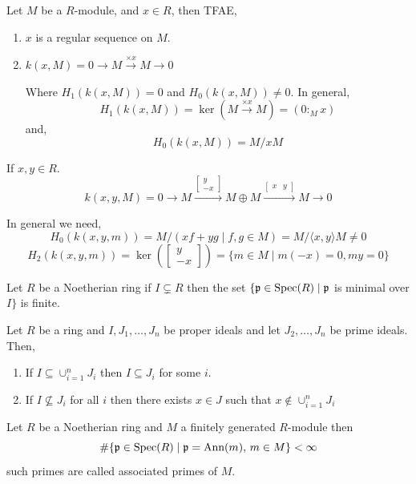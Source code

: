\documentclass[12pt]{amsart}
\begin{document}
\begin{proposition}
    Let $M$ be a $R$-module, and $x \in R$, then TFAE, 
    \begin{enumerate}
        \item $x$ is a regular sequence on $M$. 
        \item $k(x, M) = 0 \to M \xrightarrow{\times x} M \to 0$ 
        
        Where $H_1(k(x,M)) = 0$ and $H_0(k(x,M)) \neq 0$. In general, 
        \[H_1(k(x,M)) = \ker(M \xrightarrow{\times x} M) = (0:_Mx) \]
        and, 
        \[H_0(k(x,M)) = M/xM \]
    \end{enumerate}

    If $x, y \in R$. 
    \[k(x, y, M) = 0 \to M \xrightarrow{ \begin{bmatrix}
        y \\ -x
    \end{bmatrix}} M \oplus M \xrightarrow{\begin{bmatrix}
        x & y
    \end{bmatrix}} M \to 0\]

    In general we need, 
    \[H_0(k(x,y,m)) = M/(xf + yg \mid f, g \in M) = M/\langle x,y\rangle M \neq 0\]
    \[H_2(k(x,y,m)) = \ker\left(\begin{bmatrix}
        y \\ -x
    \end{bmatrix}\right) = \{m \in M \mid m(-x) = 0, my = 0\}\]
\end{proposition}

\begin{theorem}[Noether]
    Let $R$ be a Noetherian ring if $I \subsetneq R$ then the set $\{\operatorname{\mathfrak{p}} \in \operatorname{Spec}(R) \mid \operatorname{\mathfrak{p}}$ is minimal over $I\}$ is finite.
\end{theorem}

\begin{lemma}
    Let $R$ be a ring and $I, J_1, \ldots, J_n$ be proper ideals and let $J_2, \ldots, J_n$ be prime ideals. Then,
    \begin{enumerate}
        \item If $I \subseteq \cup_{i=1}^n J_i$ then $I \subseteq J_i$ for some $i$. 
        \item If $I \not \subseteq J_i$ for all $i$ then there exists $x \in J$ such that $x \notin \cup_{i=1}^n J_i$
    \end{enumerate}
\end{lemma}

\begin{theorem}
    Let $R$ be a Noetherian ring and $M$ a finitely generated $R$-module then 
    \[\# \{\operatorname{\mathfrak{p}} \in \operatorname{Spec}(R) \mid \operatorname{\mathfrak{p}} = \operatorname{\text{Ann}}(m), \, m \in M\} < \infty\]
    such primes are called associated primes of $M$. 
\end{theorem}
\end{document}
